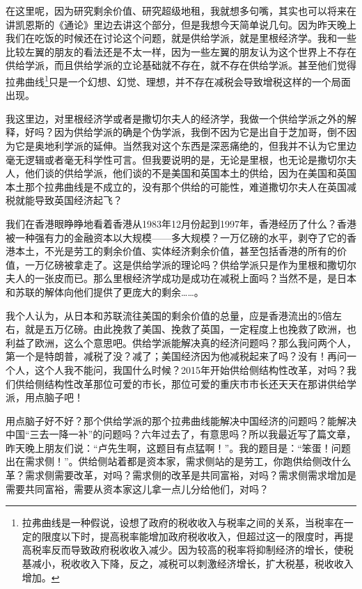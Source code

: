 \documentclass[UTF8, 12pt, a4paper]{ctexrep}
\begin{document}
在这里呢，因为研究剩余价值、研究超级地租，我就想多句嘴，其实也可以将来在讲凯恩斯的《通论》里边去讲这个部分，但是我想今天简单说几句。因为昨天晚上我们在吃饭的时候还在讨论这个问题，就是供给学派，就是里根经济学。我和一些比较左翼的朋友的看法还是不太一样，因为一些左翼的朋友认为这个世界上不存在供给学派，而且供给学派的立论基础就不存在，就不存在供给学派。甚至他们觉得拉弗曲线\footnote{拉弗曲线是一种假说，设想了政府的税收收入与税率之间的关系，当税率在一定的限度以下时，提高税率能增加政府税收收入，但超过这一的限度时，再提高税率反而导致政府税收收入减少。因为较高的税率将抑制经济的增长，使税基减小，税收收入下降，反之，减税可以刺激经济增长，扩大税基，税收收入增加。}只是一个幻想、幻觉、理想，并不存在减税会导致增税这样的一个局面出现。

我这里边，对里根经济学或者是撒切尔夫人的经济学，我做一个供给学派之外的解释，好吗？因为供给学派的确是个伪学派，我倒不因为它是出自于芝加哥，倒不因为它是奥地利学派的延伸。当然我对这个东西是深恶痛绝的，但我并不认为它里边毫无逻辑或者毫无科学性可言。但我要说明的是，无论是里根，也无论是撒切尔夫人，他们谈的供给学派，他们谈的不是美国和英国本土的供给，因为在美国和英国本土那个拉弗曲线是不成立的，没有那个供给的可能性，难道撒切尔夫人在英国减税就能导致英国经济起飞？

我们在香港眼睁睁地看着香港从1983年12月份起到1997年，香港经历了什么？香港被一种强有力的金融资本以大规模——多大规模？一万亿磅的水平，剥夺了它的香港本土，不光是劳工的剩余价值、实体经济剩余价值，甚至包括香港的所有的价值，一万亿磅被拿走了。这是供给学派的理论吗？供给学派只是作为里根和撒切尔夫人的一张皮而已。那么里根经济学成功是成功在减税上面吗？当然不是，是日本和苏联的解体向他们提供了更庞大的剩余……。

我个人认为，从日本和苏联流往美国的剩余价值的总量，应是香港流出的5倍左右，就是五万亿磅。由此挽救了美国、挽救了英国，一定程度上也挽救了欧洲，也利益了欧洲，这么个意思吧。供给学派能解决真的经济问题吗？那么我问两个人，第一个是特朗普，减税了没？减了；美国经济因为他减税起来了吗？没有！再问一个人，这个人我不能问，我国什么时候？2015年开始供给侧结构性改革，对吗？我们供给侧结构性改革那位可爱的市长，那位可爱的重庆市市长还天天在那讲供给学派，用点脑子吧！

用点脑子好不好？那个供给学派的那个拉弗曲线能解决中国经济的问题吗？能解决中国“三去一降一补”的问题吗？六年过去了，有意思吗？所以我最近写了篇文章，昨天晚上朋友们说：“卢先生啊，这题目有点猛啊！”。我的题目是：“笨蛋！问题出在需求侧！”。供给侧站着都是资本家，需求侧站的是劳工，你跑供给侧改什么革？需求侧需要改革，对吗？需求侧的改革是共同富裕，对吗？需求侧需求增加是需要共同富裕，需要从资本家这儿拿一点儿分给他们，对吗？
\end{document}
